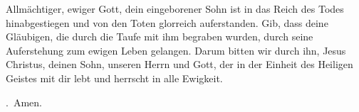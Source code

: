 \lettrine[lines=3]{A}{}llmächtiger, ewiger Gott, dein eingeborener Sohn ist in das Reich des Todes hinabgestiegen und von den Toten glorreich auferstanden. Gib, dass deine Gläubigen, die durch die Taufe mit ihm begraben wurden, durch seine Auferstehung zum ewigen Leben gelangen. Darum bitten wir durch ihn, Jesus Christus, deinen Sohn, unseren Herrn und Gott, der in der Einheit des Heiligen Geistes mit dir lebt und herrscht in alle Ewigkeit.
\par \Rbar.~Amen.
